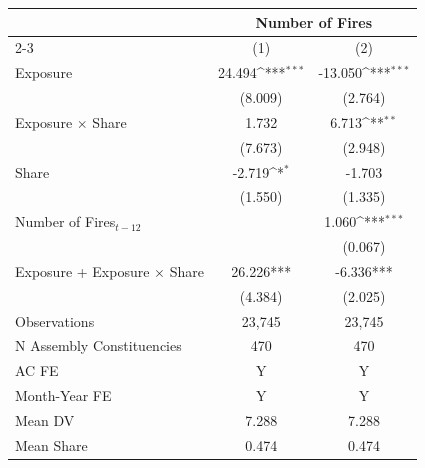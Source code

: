 {
\def\sym#1{\ifmmode^{#1}\else\(^{#1}\)\fi}
\begin{tabular}{l*{2}{c}}
\toprule
            &\multicolumn{2}{c}{Number of Fires}        \\\cmidrule(lr){2-3}
            &\multicolumn{1}{c}{(1)}         &\multicolumn{1}{c}{(2)}         \\
\midrule
Exposure    &      24.494\sym{***}&     -13.050\sym{***}\\
            &     (8.009)         &     (2.764)         \\
Exposure $\times$ Share&       1.732         &       6.713\sym{**} \\
            &     (7.673)         &     (2.948)         \\
Share       &      -2.719\sym{*}  &      -1.703         \\
            &     (1.550)         &     (1.335)         \\
Number of Fires$_{t-12}$&                     &       1.060\sym{***}\\
            &                     &     (0.067)         \\
\midrule
Exposure + Exposure $\times$ Share&   26.226***         &   -6.336***         \\
            &     (4.384)         &     (2.025)         \\
Observations&      23,745         &      23,745         \\
N Assembly Constituencies&         470         &         470         \\
AC FE       &           Y         &           Y         \\
Month-Year FE&           Y         &           Y         \\
Mean DV     &       7.288         &       7.288         \\
Mean Share  &       0.474         &       0.474         \\
\bottomrule
\end{tabular}
}
